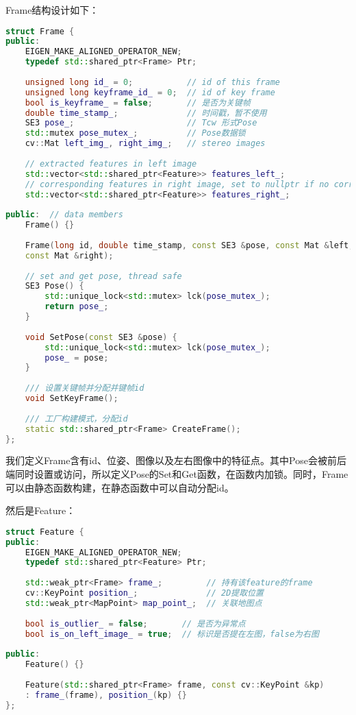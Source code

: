 Frame结构设计如下：
\begin{lstlisting}[language=c++,caption=slambook2/ch13/include/myslam/frame.h]
struct Frame {
public:
    EIGEN_MAKE_ALIGNED_OPERATOR_NEW;
    typedef std::shared_ptr<Frame> Ptr;
    
    unsigned long id_ = 0;           // id of this frame
    unsigned long keyframe_id_ = 0;  // id of key frame
    bool is_keyframe_ = false;       // 是否为关键帧
    double time_stamp_;              // 时间戳，暂不使用
    SE3 pose_;                       // Tcw 形式Pose
    std::mutex pose_mutex_;          // Pose数据锁
    cv::Mat left_img_, right_img_;   // stereo images
    
    // extracted features in left image
    std::vector<std::shared_ptr<Feature>> features_left_;
    // corresponding features in right image, set to nullptr if no corresponding
    std::vector<std::shared_ptr<Feature>> features_right_;
    
public:  // data members
    Frame() {}
    
    Frame(long id, double time_stamp, const SE3 &pose, const Mat &left,
    const Mat &right);
    
    // set and get pose, thread safe
    SE3 Pose() {
        std::unique_lock<std::mutex> lck(pose_mutex_);
        return pose_;
    }
    
    void SetPose(const SE3 &pose) {
        std::unique_lock<std::mutex> lck(pose_mutex_);
        pose_ = pose;
    }
    
    /// 设置关键帧并分配并键帧id
    void SetKeyFrame();
    
    /// 工厂构建模式，分配id 
    static std::shared_ptr<Frame> CreateFrame();
};
\end{lstlisting}

我们定义Frame含有id、位姿、图像以及左右图像中的特征点。其中Pose会被前后端同时设置或访问，所以定义Pose的Set和Get函数，在函数内加锁。同时，Frame可以由静态函数构建，在静态函数中可以自动分配id。

然后是Feature：
\begin{lstlisting}[language=c++,caption=slambook2/ch13/include/myslam/feature.h]
struct Feature {
public:
    EIGEN_MAKE_ALIGNED_OPERATOR_NEW;
    typedef std::shared_ptr<Feature> Ptr;
    
    std::weak_ptr<Frame> frame_;         // 持有该feature的frame
    cv::KeyPoint position_;              // 2D提取位置
    std::weak_ptr<MapPoint> map_point_;  // 关联地图点
    
    bool is_outlier_ = false;       // 是否为异常点
    bool is_on_left_image_ = true;  // 标识是否提在左图，false为右图
    
public:
    Feature() {}
    
    Feature(std::shared_ptr<Frame> frame, const cv::KeyPoint &kp)
    : frame_(frame), position_(kp) {}
};
\end{lstlisting}

